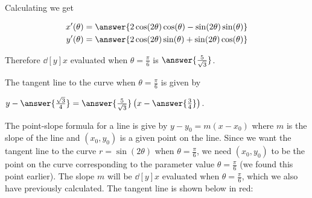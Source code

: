 \documentclass{ximera}
\begin{document}
\begin{exercise}
\begin{exercise}
\begin{hint}
Calculating we get

\begin{align*}
x'(\theta)&=\answer{ 2\cos(2\theta)\cos(\theta)- \sin(2\theta)\sin(\theta)} \\
y'(\theta)&=\answer{ 2\cos(2\theta)\sin(\theta)+\sin(2\theta)\cos(\theta) }
\end{align*} 

Therefore $\dd[y]{x}$ evaluated when $\theta=\frac{\pi}{6}$ is $\answer{ \frac{5}{\sqrt{3}}  }$.


\end{hint}

\begin{exercise}

The tangent line to the curve when $\theta=\frac{\pi}{6}$ is given by 

$y-\answer{\frac{\sqrt{3}}{4}   }=\answer{ \frac{5}{\sqrt{3}}  }\left( x- \answer{  \frac{3}{4} }  \right)$. 

\begin{hint}


The point-slope formula for a line is give by $y-y_{0}=m(x-x_{0})$ where $m$ is the slope of the line and $(x_{0},y_{0})$ is a given point on the line. 
Since we want the tangent line to the curve $r=\sin(2\theta)$ when $\theta=\frac{\pi}{6}$, we need $(x_{0},y_{0})$ to be the point on the curve corresponding to the parameter value $\theta=\frac{\pi}{6}$ (we found this point earlier). The slope $m$ will be $\dd[y]{x}$ evaluated when $\theta=\frac{\pi}{6}$, which we also have previously calculated. 
The tangent line is shown below in red:

\begin{image}  
\end{image} 


\end{hint}

\end{exercise}
\end{exercise}
\end{exercise}
\end{document}
